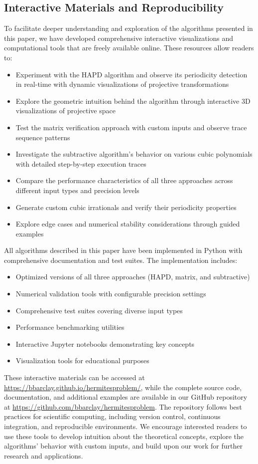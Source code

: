 \subsection{Interactive Materials and Reproducibility}

To facilitate deeper understanding and exploration of the algorithms presented in this paper, we have developed comprehensive interactive visualizations and computational tools that are freely available online. These resources allow readers to:

\begin{itemize}
\item Experiment with the HAPD algorithm and observe its periodicity detection in real-time with dynamic visualizations of projective transformations
\item Explore the geometric intuition behind the algorithm through interactive 3D visualizations of projective space
\item Test the matrix verification approach with custom inputs and observe trace sequence patterns
\item Investigate the subtractive algorithm's behavior on various cubic polynomials with detailed step-by-step execution traces
\item Compare the performance characteristics of all three approaches across different input types and precision levels
\item Generate custom cubic irrationals and verify their periodicity properties
\item Explore edge cases and numerical stability considerations through guided examples
\end{itemize}

All algorithms described in this paper have been implemented in Python with comprehensive documentation and test suites. The implementation includes:

\begin{itemize}
\item Optimized versions of all three approaches (HAPD, matrix, and subtractive)
\item Numerical validation tools with configurable precision settings
\item Comprehensive test suites covering diverse input types
\item Performance benchmarking utilities
\item Interactive Jupyter notebooks demonstrating key concepts
\item Visualization tools for educational purposes
\end{itemize}

These interactive materials can be accessed at \url{https://bbarclay.github.io/hermitesproblem/}, while the complete source code, documentation, and additional examples are available in our GitHub repository at \url{https://github.com/bbarclay/hermitesproblem}. The repository follows best practices for scientific computing, including version control, continuous integration, and reproducible environments. We encourage interested readers to use these tools to develop intuition about the theoretical concepts, explore the algorithms' behavior with custom inputs, and build upon our work for further research and applications.
